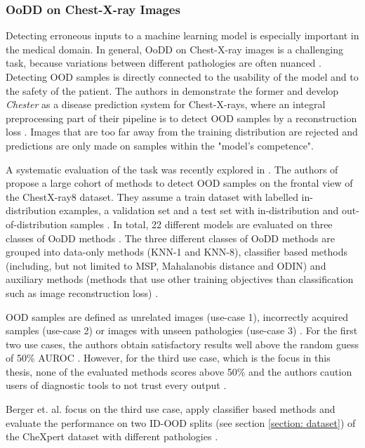 \subsubsection{OoDD on Chest-X-ray Images}
Detecting erroneous inputs to a machine learning model is especially important in the medical domain.
In general, OoDD on Chest-X-ray images is a challenging task, because variations between different pathologies are often nuanced \citep{Salehi2022}.
Detecting OOD samples is directly connected to the usability of the model and to the safety of the patient.
The authors in \citep{Cohen2019} demonstrate the former and develop \textit{Chester} as a disease prediction system for Chest-X-rays, where an integral preprocessing part of their pipeline is to detect OOD samples by a reconstruction loss \citep{Dumoulin2017}. 
Images that are too far away from the training distribution are rejected \citep{Cohen2019} and predictions are only made on samples within the "model's competence".
\par
A systematic evaluation of the task was recently explored in \citep{Cao2020}.
The authors of \citep{Cao2020} propose a large cohort of methods to detect OOD samples on the frontal view of the ChestX-ray8 \citep{Wang2017} dataset.
They assume a train dataset with labelled in-distribution examples, a validation set and a test set with in-distribution and out-of-distribution samples \citep{Cao2020}.
In total, 22 different models are evaluated on three classes of OoDD methods \citep{Cao2020}.
The three different classes of OoDD methods are grouped into data-only methods (KNN-1 and KNN-8), classifier based methods (including, but not limited to MSP, Mahalanobis distance and ODIN) and auxiliary methods (methods that use other training objectives than classification such as image reconstruction loss) \citep{Cao2020}.
\par
OOD samples are defined as unrelated images (use-case 1), incorrectly acquired samples (use-case 2) or images with unseen pathologies (use-case 3) \citep{Cao2020}.
For the first two use cases, the authors obtain satisfactory results well above the random guess of 50\% AUROC \citep{Cao2020}.
However, for the third use case, which is the focus in this thesis, none of the evaluated methods scores above 50\% and the authors caution users of diagnostic tools to not trust every output \citep{Cao2020}.
\par
Berger et. al. focus on the third use case, apply classifier based methods and evaluate the performance on two ID-OOD splits (see section \ref{section: dataset}) of the CheXpert dataset \citep{Irvin2019} with different pathologies \citep{Berger2021}.
